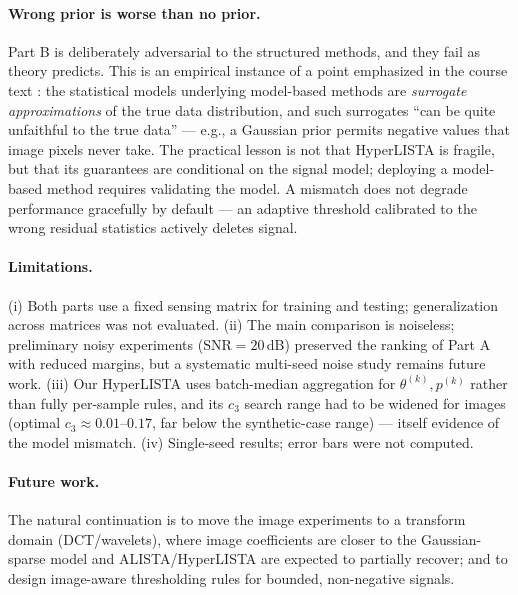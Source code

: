 \documentclass[12pt,a4paper]{article}
\begin{document}
\paragraph{Wrong prior is worse than no prior.} Part B is deliberately adversarial to the structured methods, and they fail as theory predicts. This is an empirical instance of a point emphasized in the course text \cite{shlezinger2023mbdl}: the statistical models underlying model-based methods are \emph{surrogate approximations} of the true data distribution, and such surrogates ``can be quite unfaithful to the true data'' --- e.g., a Gaussian prior permits negative values that image pixels never take. The practical lesson is not that HyperLISTA is fragile, but that its guarantees are conditional on the signal model; deploying a model-based method requires validating the model. A mismatch does not degrade performance gracefully by default --- an adaptive threshold calibrated to the wrong residual statistics actively deletes signal.

\paragraph{Limitations.} (i) Both parts use a fixed sensing matrix for training and testing; generalization across matrices was not evaluated. (ii) The main comparison is noiseless; preliminary noisy experiments ($\mathrm{SNR}=20$\,dB) preserved the ranking of Part A with reduced margins, but a systematic multi-seed noise study remains future work. (iii) Our HyperLISTA uses batch-median aggregation for $\theta^{(k)}, p^{(k)}$ rather than fully per-sample rules, and its $c_3$ search range had to be widened for images (optimal $c_3\approx 0.01$--$0.17$, far below the synthetic-case range) --- itself evidence of the model mismatch. (iv) Single-seed results; error bars were not computed.

\paragraph{Future work.} The natural continuation is to move the image experiments to a transform domain (DCT/wavelets), where image coefficients are closer to the Gaussian-sparse model and ALISTA/HyperLISTA are expected to partially recover; and to design image-aware thresholding rules for bounded, non-negative signals.
\end{document}
